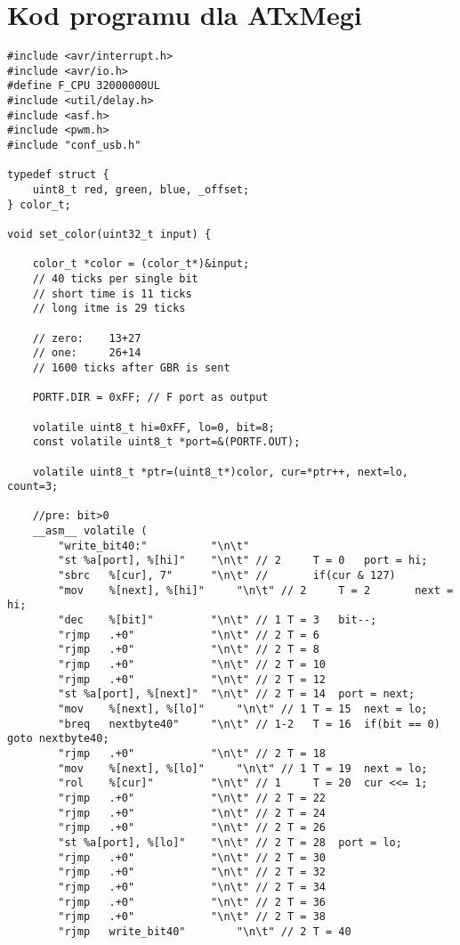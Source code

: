 \documentclass[a4paper]{article}
\begin{document}
\section{Kod programu dla ATxMegi}

\begin{lstlisting}
#include <avr/interrupt.h>
#include <avr/io.h>
#define F_CPU 32000000UL
#include <util/delay.h>
#include <asf.h>
#include <pwm.h>
#include "conf_usb.h"

typedef struct {
    uint8_t red, green, blue, _offset;
} color_t;

void set_color(uint32_t input) {

    color_t *color = (color_t*)&input;
    // 40 ticks per single bit
    // short time is 11 ticks
    // long itme is 29 ticks

    // zero:    13+27
    // one:     26+14
    // 1600 ticks after GBR is sent

    PORTF.DIR = 0xFF; // F port as output

    volatile uint8_t hi=0xFF, lo=0, bit=8;
    const volatile uint8_t *port=&(PORTF.OUT);

    volatile uint8_t *ptr=(uint8_t*)color, cur=*ptr++, next=lo, count=3;

    //pre: bit>0
    __asm__ volatile (
        "write_bit40:"          "\n\t"
        "st %a[port], %[hi]"    "\n\t" // 2     T = 0   port = hi;
        "sbrc   %[cur], 7"      "\n\t" //       if(cur & 127)
        "mov    %[next], %[hi]"     "\n\t" // 2     T = 2       next = hi;
        "dec    %[bit]"         "\n\t" // 1 T = 3   bit--;
        "rjmp   .+0"            "\n\t" // 2 T = 6
        "rjmp   .+0"            "\n\t" // 2 T = 8
        "rjmp   .+0"            "\n\t" // 2 T = 10
        "rjmp   .+0"            "\n\t" // 2 T = 12
        "st %a[port], %[next]"  "\n\t" // 2 T = 14  port = next;
        "mov    %[next], %[lo]"     "\n\t" // 1 T = 15  next = lo;
        "breq   nextbyte40"     "\n\t" // 1-2   T = 16  if(bit == 0) goto nextbyte40;
        "rjmp   .+0"            "\n\t" // 2 T = 18
        "mov    %[next], %[lo]"     "\n\t" // 1 T = 19  next = lo;
        "rol    %[cur]"         "\n\t" // 1     T = 20  cur <<= 1;
        "rjmp   .+0"            "\n\t" // 2 T = 22
        "rjmp   .+0"            "\n\t" // 2 T = 24
        "rjmp   .+0"            "\n\t" // 2 T = 26
        "st %a[port], %[lo]"    "\n\t" // 2 T = 28  port = lo;
        "rjmp   .+0"            "\n\t" // 2 T = 30
        "rjmp   .+0"            "\n\t" // 2 T = 32
        "rjmp   .+0"            "\n\t" // 2 T = 34
        "rjmp   .+0"            "\n\t" // 2 T = 36
        "rjmp   .+0"            "\n\t" // 2 T = 38
        "rjmp   write_bit40"        "\n\t" // 2 T = 40


\end{lstlisting}
\end{document}
